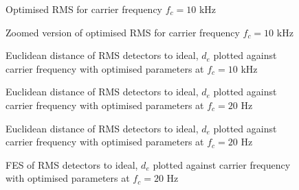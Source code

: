 \documentclass[../main2.tex]{subfiles}
\providecommand{\rootdir}{..}
\begin{document}
\begin{figure}[h]
\centerline{}
\caption{Optimised RMS for carrier frequency $f_c=10$ kHz}
\label{fig:peak_det_opt_env_th_up}
\end{figure}

\begin{figure}[h]
\centerline{}
\caption{Zoomed version of optimised RMS for carrier frequency $f_c=10$ kHz}
\label{fig:peak_det_opt_env_fc_dep_th_up}
\end{figure}

\begin{figure}[h]
\centerline{}
\caption{Euclidean distance of RMS detectors to ideal, $d_e$ plotted against carrier frequency with optimised parameters at $f_c=10$ kHz}
\label{fig:rms_det_opt_env_fc10000_dep_error}
\end{figure}

\begin{figure}[h]
\centerline{}
\caption{Euclidean distance of RMS detectors to ideal, $d_e$ plotted against carrier frequency with optimised parameters at $f_c=20$ Hz}
\label{fig:rms_det_opt_env_fc20_dep_error}
\end{figure}

\begin{figure}[h]
\centerline{}
\caption{Euclidean distance of RMS detectors to ideal, $d_e$ plotted against carrier frequency with optimised parameters at $f_c=20$ Hz}
\label{fig:rms_det_opt_env_fc20_dep_error}
\end{figure}

\begin{figure}[h]
\centerline{}
\caption{FES of RMS detectors to ideal, $d_e$ plotted against carrier frequency with optimised parameters at $f_c=20$ Hz}
\label{fig:rms_det_opt_env_fc20_dep_fes}
\end{figure}
\end{document}
